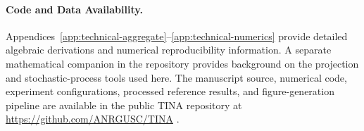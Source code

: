 \documentclass[11pt]{article}
\begin{document}
\paragraph{Code and Data Availability.}
Appendices~\ref{app:technical-aggregate}--\ref{app:technical-numerics} provide detailed algebraic
derivations and numerical reproducibility information. A separate mathematical
companion in the repository provides background on the projection and
stochastic-process tools used here.
The manuscript source, numerical code, experiment configurations, processed
reference results, and figure-generation pipeline are available in the public
TINA repository at \url{https://github.com/ANRGUSC/TINA}
\cite{tina2026software}.




\clearpage
\appendix
{}

\end{document}
